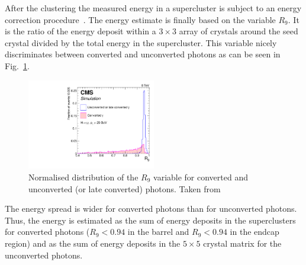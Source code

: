 After the clustering the measured energy in a supercluster is subject to an energy correction procedure~\cite{bib:CMS:PhotonIdentification_8TeV}.
The energy estimate is finally based on the variable $R_9$.
It is the ratio of the energy deposit within a $3\times 3$ array of crystals around the seed crystal divided by the total energy in the supercluster.
This variable nicely discriminates between converted and unconverted photons as can be seen in Fig.~\ref{fig:PhotonR9}.
\begin{figure}[!t]
  \centering
      \includegraphics[width=0.50\textwidth]{figures/experiment/ObjectReconstruction/convUnconvR9Linear}
      \caption{Normalised distribution of the $R_9$ variable for converted and unconverted (or late converted) photons. Taken from~\cite{bib:CMS:PhotonIdentification_8TeV}}  
  \label{fig:PhotonR9}
\end{figure}
The energy spread is wider for converted photons than for unconverted photons.
Thus, the energy is estimated as the sum of energy deposits in the superclusters for converted photons ($R_9<0.94$ in the barrel and $R_9<0.94$ in the endcap region) and as the sum of energy deposits in the $5\times5$ crystal matrix for the unconverted photons.


